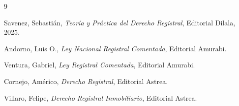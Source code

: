 \documentclass[12pt,oneside]{book}
\begin{document}

\begin{thebibliography}{9}

Savenez, Sebastián,
\textit{Teoría y Práctica del Derecho Registral},
Editorial Dilala, 2025.

Andorno, Luis O.,
\textit{Ley Nacional Registral Comentada},
Editorial Amurabi.

Ventura, Gabriel,
\textit{Ley Registral Comentada},
Editorial Amurabi.

Cornejo, Américo,
\textit{Derecho Registral},
Editorial Astrea.

Villaro, Felipe,
\textit{Derecho Registral Inmobiliario},
Editorial Astrea.

\end{thebibliography}
\end{document}
